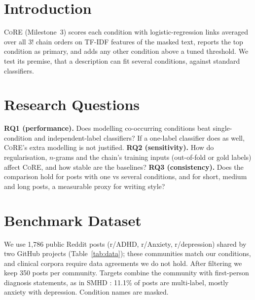 \documentclass[sigconf]{acmart}
\newcommand{\core}{\textsc{CoRE}}
\begin{document}
\section{Introduction}
\core{} (Milestone~3) scores each condition with logistic-regression links averaged over all $3!$ chain orders on TF-IDF features of the masked text, reports the top condition as primary, and adds any other condition above a tuned threshold. We test its premise, that a description can fit several conditions, against standard classifiers.

\section{Research Questions}
\textbf{RQ1 (performance).} Does modelling co-occurring conditions beat single-condition and independent-label classifiers? If a one-label classifier does as well, \core{}'s extra modelling is not justified.
\textbf{RQ2 (sensitivity).} How do regularisation, $n$-grams and the chain's training inputs (out-of-fold or gold labels) affect \core{}, and how stable are the baselines?
\textbf{RQ3 (consistency).} Does the comparison hold for posts with one vs several conditions, and for short, medium and long posts, a measurable proxy for writing style?

\section{Benchmark Dataset}
We use 1,786 public Reddit posts (r/ADHD, r/Anxiety, r/depression) shared by two GitHub projects (Table~\ref{tab:data}); these communities match our conditions, and clinical corpora require data agreements we do not hold. After filtering we keep 350 posts per community. Targets combine the community with first-person diagnosis statements, as in SMHD \cite{cohan2018smhd}: 11.1\% of posts are multi-label, mostly anxiety with depression. Condition names are masked.

\begin{table}[t]
\caption{Benchmark dataset (bundled public sample).}\label{tab:data}
\vspace{-6pt}
\footnotesize

\vspace{-8pt}
\end{table}
\end{document}

